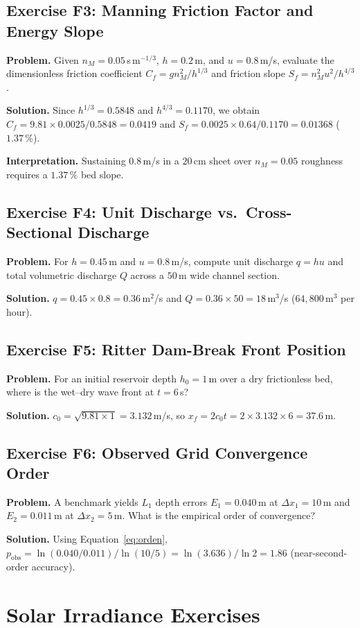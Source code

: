 \documentclass[11pt,a4paper]{article}
\begin{document}
\subsection*{Exercise F3: Manning Friction Factor and Energy Slope}
\textbf{Problem.} Given $n_M=0.05$\,s\,m$^{-1/3}$, $h=0.2$\,m, and $u=0.8$\,m/s, evaluate the dimensionless friction coefficient $C_f=gn_M^2/h^{1/3}$ and friction slope $S_f=n_M^2u^2/h^{4/3}$.

\textbf{Solution.} Since $h^{1/3}=0.5848$ and $h^{4/3}=0.1170$, we obtain $C_f=9.81\times0.0025/0.5848=0.0419$ and $S_f=0.0025\times0.64/0.1170=0.01368$ ($1.37\,\%$).

\textbf{Interpretation.} Sustaining $0.8$\,m/s in a $20$\,cm sheet over $n_M=0.05$ roughness requires a $1.37\,\%$ bed slope.

\subsection*{Exercise F4: Unit Discharge vs.\ Cross-Sectional Discharge}
\textbf{Problem.} For $h=0.45$\,m and $u=0.8$\,m/s, compute unit discharge $q=hu$ and total volumetric discharge $Q$ across a $50$\,m wide channel section.

\textbf{Solution.} $q=0.45\times0.8=0.36$\,m$^2$/s and $Q=0.36\times50=18$\,m$^3$/s ($64,800$\,m$^3$ per hour).

\subsection*{Exercise F5: Ritter Dam-Break Front Position}
\textbf{Problem.} For an initial reservoir depth $h_0=1$\,m over a dry frictionless bed, where is the wet--dry wave front at $t=6$\,s?

\textbf{Solution.} $c_0=\sqrt{9.81\times 1}=3.132$\,m/s, so $x_f=2c_0t=2\times3.132\times6=37.6$\,m.

\subsection*{Exercise F6: Observed Grid Convergence Order}
\textbf{Problem.} A benchmark yields $L_1$ depth errors $E_1=0.040$\,m at $\Delta x_1=10$\,m and $E_2=0.011$\,m at $\Delta x_2=5$\,m. What is the empirical order of convergence?

\textbf{Solution.} Using Equation~\eqref{eq:orden}, $p_{\text{obs}}=\ln(0.040/0.011)/\ln(10/5)=\ln(3.636)/\ln 2=1.86$ (near-second-order accuracy).

\section{Solar Irradiance Exercises}
\label{sec:ej-solar}
\end{document}
